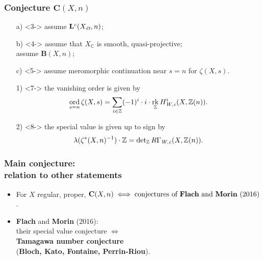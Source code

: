 \documentclass[handout]{beamer}
\newcommand{\personality}[1]{{\bf #1}}
\newcommand{\ZZ}{\mathbb{Z}}
\newcommand{\CC}{\mathbb{C}}
\DeclareMathOperator{\ord}{ord}
\DeclareMathOperator{\rk}{rk}
\newcommand{\term}{\textbf}
\begin{document}
\begin{frame}
  \frametitle{Conjecture $\mathbf{C} (X,n)$}


  \begin{enumerate}
  \item[a)]<3-> assume $\mathbf{L}^c (X_\text{\it ét}, n)$;

  \item[b)]<4-> assume that $X_\CC$ is smooth, quasi-projective;\\
    assume $\mathbf{B}(X, n)$;

  \item[c)]<5-> assume meromorphic continuation near $s = n$ for $\zeta (X, s)$.
  \end{enumerate}


  \begin{enumerate}
  \item[1)]<7-> the vanishing order is given by
    \[ \ord_{s=n} \zeta (X,s) =
      \sum_{i\in\ZZ} (-1)^i \cdot i\cdot \rk_\ZZ H^i_\text{\it W,c} (X, \ZZ(n)). \]

  \item[2)]<8-> the special value is given up to sign by
    \[ \lambda (\zeta^* (X, n)^{-1}) \cdot \ZZ =
      \det\nolimits_\ZZ R\Gamma_\text{\it W,c} (X, \ZZ(n)). \]
  \end{enumerate}
\end{frame}


\begin{frame}
  \frametitle{Main conjecture:\\
    relation to other statements}

  \begin{itemize}
  \item<2-> For $X$ regular, proper,
    $\mathbf{C} (X,n) \iff \text{conjectures of \personality{Flach} and \personality{Morin} (2016)}$.

  \item<3-> \personality{Flach} and \personality{Morin} (2016):\\
    their special value conjecture $\iff$\\
    \term{Tamagawa number conjecture}\\
    (\personality{Bloch, Kato, Fontaine, Perrin-Riou}).
  \end{itemize}
\end{frame}
\end{document}
